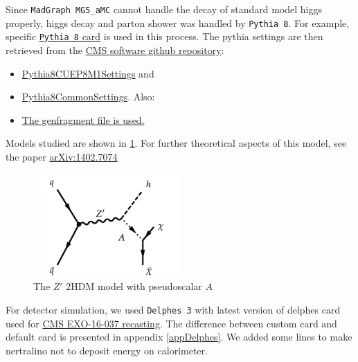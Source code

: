 \documentclass[12pt,A4paper]{article}
\begin{document}
Since \texttt{MadGraph MG5\_aMC} cannot handle the decay of standard model higgs properly, higgs decay and parton shower was handled by \texttt{Pythia 8}.
For example, specific \href{https://github.com/cms-sw/genproductions/blob/master/python/ThirteenTeV/monoHiggs/pythia8_hadronizer_nomatching_Haa_cff.py}{\texttt{Pythia 8} card} is used in this process.
The pythia settings are then retrieved from the \href{https://github.com/cms-sw/genproductions/blob/master/python/ThirteenTeV/monoHiggs/pythia8_hadronizer_nomatching_Haa_cff.py}{CMS software github repository}:
\begin{itemize}
    \item \href{https://github.com/cms-sw/cmssw/blob/CMSSW_7_1_9_patch/Configuration/Generator/python/Pythia8CUEP8M1Settings_cfi.py}{Pythia8CUEP8M1Settings} and
    \item \href{https://github.com/cms-sw/cmssw/blob/CMSSW_7_2_X/Configuration/Generator/python/Pythia8CommonSettings_cfi.py}{Pythia8CommonSettings}. Also:
    \item \href{https://github.com/cms-sw/genproductions/blob/master/python/ThirteenTeV/monoHiggs/pythia8_hadronizer_nomatching_Haa_cff.py}{The genfragment file is used.}
\end{itemize}


Models studied are shown in \ref{fig:model1}. For further theoretical aspects of this model, see the paper \href{https://arxiv.org/abs/1402.7074}{arXiv:1402.7074}

\begin{figure}[h!]
    \centering
    \includegraphics[width=0.5\textwidth]{img/model_fig1.png}
    \caption{The $Z'$ 2HDM model with pseudoscalar $A$}
    \label{fig:model1}
\end{figure}

For detector simulation, we used \texttt{Delphes 3} with latest version of delphes card used for \href{https://madanalysis.irmp.ucl.ac.be/wiki/PublicAnalysisDatabase}{CMS EXO-16-037 recasting}. The difference between custom card and default card is presented in appendix \ref{appDelphes}. We added some lines to make nertralino not to deposit energy on calorimeter. 
\end{document}
